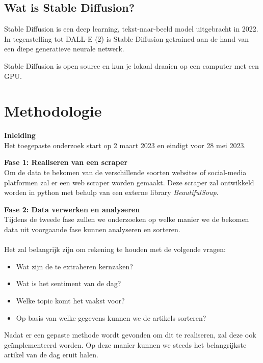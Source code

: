 \subsection{Wat is Stable Diffusion?}
\noindent
Stable Diffusion is een deep learning, tekst-naar-beeld model uitgebracht in 2022. In tegenstelling tot DALL-E (2) is Stable Diffusion getrained aan de hand van een diepe generatieve neurale netwerk.
\autocite{StableDifWikipediaEN}

Stable Diffusion is open source en kun je lokaal draaien op een computer met een GPU.



\section{Methodologie}%
\label{sec:methodologie}
\noindent
\textbf{Inleiding} \\
Het toegepaste onderzoek start op 2 maart 2023 en eindigt voor 28 mei 2023.

\noindent
\textbf{Fase 1: Realiseren van een scraper} \\
Om de data te bekomen van de verschillende soorten websites of social-media platformen zal er een web scraper worden gemaakt. Deze scraper zal ontwikkeld worden in python met behulp van een externe library \emph{BeautifulSoup}.

\noindent
\textbf{Fase 2: Data verwerken en analyseren} \\
Tijdens de tweede fase zullen we onderzoeken op welke manier we de bekomen data uit voorgaande fase kunnen analyseren en sorteren. \\ \\
\noindent
Het zal belangrijk zijn om rekening te houden met de volgende vragen: 
\begin{itemize}
    \item Wat zijn de te extraheren kernzaken?
    \item Wat is het sentiment van de dag? 
    \item Welke topic komt het vaakst voor?
    \item Op basis van welke gegevens kunnen we de artikels sorteren? 
\end{itemize}

\noindent
Nadat er een gepaste methode wordt gevonden om dit te realiseren, zal deze ook geïmplementeerd worden. Op deze manier kunnen we steeds het belangrijkste artikel van de dag eruit halen. \\

